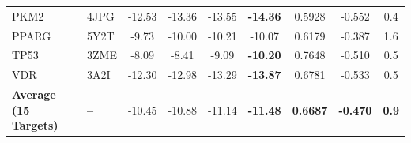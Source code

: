 \begin{table}[t]
\begin{tabular}{llccccccc}
PKM2         & 4JPG   & -12.53 & -13.36 & -13.55 & \textbf{-14.36} & 0.5928 & -0.552 & 0.4 \\
PPARG        & 5Y2T   &  -9.73 & -10.00 & -10.21 & -10.07 & 0.6179 & -0.387 & 1.6 \\
TP53         & 3ZME   &  -8.09 &  -8.41 &  -9.09 & \textbf{-10.20} & 0.7648 & -0.510 & 0.5 \\
VDR          & 3A2I   & -12.30 & -12.98 & -13.29 & \textbf{-13.87} & 0.6781 & -0.533 & 0.5 \\
\midrule
\textbf{Average (15 Targets)} & \textbf{--} & -10.45 & -10.88 & -11.14 & \textbf{-11.48} & \textbf{0.6687} & \textbf{-0.470} & \textbf{0.9} \\
\bottomrule
\end{tabular}
\end{table}

